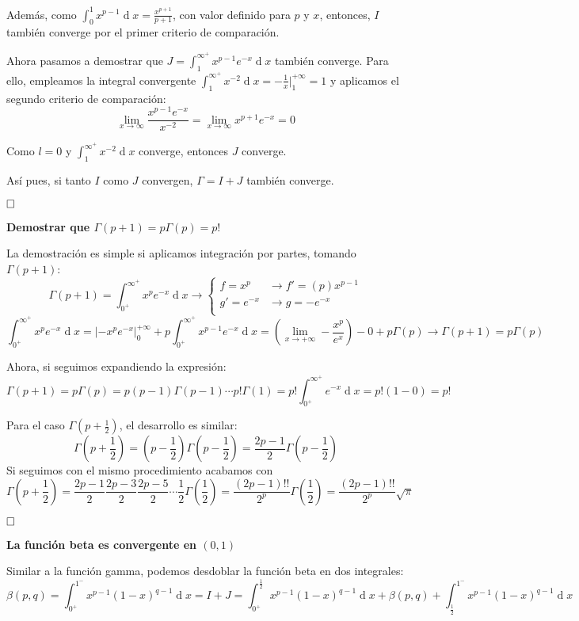 \documentclass[a4paper]{article}
\renewcommand{\d}[1]{\ensuremath{\operatorname{d}\!{#1}}}
\newcommand{\qed}{\begin{flushright}
		{$\newline\square$}
	\end{flushright}}
\begin{document}
Además, como $\int_0^1 x^{p-1} \d x = \frac{x^{p+1}}{p+1}$, con valor definido para $p$ y $x$, entonces, $I$ también converge por el primer criterio de comparación.

Ahora pasamos a demostrar que $J = \int_{1}^{\infty^+} x^{p-1} e^{-x} \d{x}$ también converge.
Para ello, empleamos la integral convergente $\int_{1}^{\infty^+} x^{-2} \d{x} = -\frac{1}{x}|^{+\infty}_1 = 1$ y aplicamos el segundo criterio de comparación:
$$ \lim_{x\rightarrow\infty} \frac{x^{p-1} e^{-x}}{x^{-2}} = \lim_{x\rightarrow\infty} x^{p+1} e^{-x} = 0$$

Como $l= 0$ y $\int_{1}^{\infty^+} x^{-2} \d{x}$ converge, entonces $J$ converge.

Así pues, si tanto $I$ como $J$ convergen, $\Gamma = I + J$ también converge. \qed

\textbf{Demostrar que $\Gamma(p+1) = p \Gamma(p) = p!$}

La demostración es simple si aplicamos integración por partes, tomando $\Gamma(p+1)$:
$$\Gamma(p+1) = \int_{0^+}^{\infty^+} x^{p} e^{-x} \d{x} \rightarrow 
\begin{cases}
f = x^{p}  & \rightarrow  f' = (p)x^{p-1}\\
g' = e^{-x} & \rightarrow  g = -e^{-x}\\
\end{cases}$$
$$\int_{0^+}^{\infty^+} x^{p} e^{-x} \d{x} = \left| -x^{p}e^{-x}\right|^{+\infty}_0 + p\int_{0^+}^{\infty^+} x^{p-1} e^{-x} \d{x} = \left(\lim_{x\rightarrow+\infty} -\frac{x^p}{e^{x}}\right) - 0 + p\Gamma(p)\rightarrow\Gamma(p+1) = p\Gamma(p)$$

Ahora, si seguimos expandiendo la expresión:
$$\Gamma(p+1) = p\Gamma(p) = p(p-1)\Gamma(p-1) \cdots p! \Gamma(1) = p! \int_{0^+}^{\infty^+} e^{-x} \d{x} = p! (1-0) = p!$$

Para el caso $\Gamma(p+\frac{1}{2})$, el desarrollo es similar:
$$\Gamma\left(p+\frac{1}{2}\right) = \left(p-\frac{1}{2}\right)\Gamma\left(p-\frac{1}{2}\right) = \frac{2p-1}{2}\Gamma\left(p-\frac{1}{2}\right)$$
Si seguimos con el mismo procedimiento acabamos con 
$$\Gamma\left(p+\frac{1}{2}\right) =\frac{2p-1}{2}\frac{2p-3}{2}\frac{2p-5}{2}\cdots\frac{1}{2}\Gamma\left(\frac{1}{2}\right) = \frac{(2p-1)!!}{2^p}\Gamma\left(\frac{1}{2}\right) = \frac{(2p-1)!!}{2^p}\sqrt{\pi}$$\qed


\textbf{La función beta es convergente en $(0,1)$}

Similar a la función gamma, podemos desdoblar la función beta en dos integrales:
$$\beta(p,q) = \int_{0^+}^{1^-} x^{p-1}(1-x)^{q-1} \d x = I+J =  \int_{0^+}^{\frac{1}{2}} x^{p-1}(1-x)^{q-1} \d x + \beta(p,q) +  \int_{\frac{1}{2}}^{1^-} x^{p-1}(1-x)^{q-1} \d x$$
\end{document}
